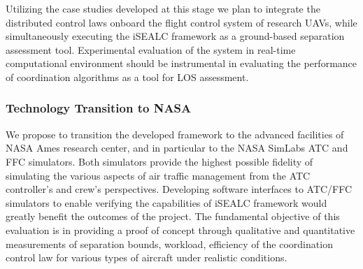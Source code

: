 \documentclass[letter,onecolumn,12pt]{aiaa-tc}
\newcommand{\1}{1_n}
\begin{document}
Utilizing the case studies developed at this stage we plan to integrate the distributed control laws onboard the flight control system of research UAVs, while simultaneously executing the iSEALC framework as a ground-based separation assessment tool. Experimental evaluation of the system in real-time computational environment should be instrumental in evaluating the performance of coordination algorithms as a tool for LOS assessment.


\subsubsection{Technology Transition to NASA}

We propose to transition the developed framework to the advanced facilities of NASA Ames research center, and in particular to the NASA SimLabs ATC and FFC simulators\cite{prevot2003distributed}. Both simulators provide the highest possible fidelity of simulating the various aspects of air traffic management from the ATC controller's and crew's perspectives. Developing software interfaces to ATC/FFC simulators to enable verifying the capabilities of iSEALC framework would greatly benefit the outcomes of the project. The fundamental objective of this evaluation is in providing a proof of concept through qualitative and quantitative measurements of separation bounds, workload, efficiency of the coordination control law for various types of aircraft under realistic conditions.




\end{document}
